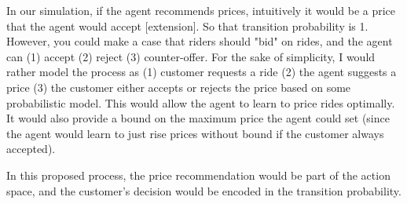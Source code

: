 \documentclass[12pt]{article}
\begin{document}
In our simulation, if the agent recommends prices, intuitively it would be a price that the agent
would accept [extension]. So that transition probability is 1. However, you could make a
case that riders
should "bid" on rides, and the agent can (1) accept (2) reject (3) counter-offer. For the sake
of simplicity, I would rather model the process as (1) customer requests a ride (2) the agent
suggests a price (3) the customer either accepts or rejects the price based on some
probabilistic model. This would allow the agent to learn to price rides optimally. It would also
provide a bound on the maximum price the agent could set (since the agent would learn to just rise
prices without bound if the customer always accepted).

In this proposed process, the price recommendation would be part of the action space, and the
customer's decision would be encoded in the transition probability.
\end{document}
